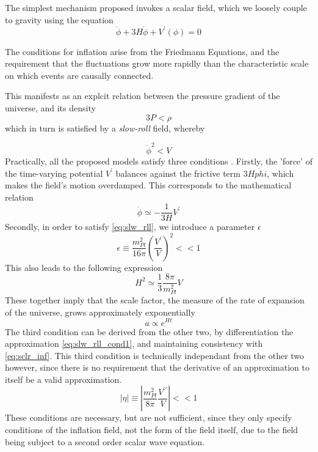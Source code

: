 The simplest mechanism proposed invokes a scalar field, which we loosely couple to gravity using the equation 
\begin{equation}\label{eq:sclr_inf}
\ddot{\phi} + 3 H \dot{\phi} + V^\prime(\phi) = 0
\end{equation}

The conditions for inflation arise from the Friedmann Equations, and the requirement that the fluctuations grow more rapidly than the characteristic scale on which events are causally connected. 

This manifests as an explcit relation between the pressure gradient of the universe, and its density
\begin{equation}\label{eq:inf_cndtn}
3 P < \rho
\end{equation}
which in turn is satisfied by a \emph{slow-roll} field, whereby 

\begin{equation}\label{eq:slw_rll}
\dot{\phi}^2 < V
\end{equation}
Practically, all the proposed models satisfy three conditions \cite{LiddleLyth:00}. Firstly, the 'force' of the time-varying potential $V^\prime$ balances against the frictive term $3 H \dot{phi}$, which makes the field's motion overdamped. This corresponds to the mathematical relation
\begin{equation}\label{eq:slw_rll_cond1}
\dot{\phi} \simeq - \frac{1}{3 H} V^\prime
\end{equation} 
Secondly, in order to satisfy \ref{eq:slw_rll}, we introduce a parameter $\epsilon$ 
\begin{equation}\label{eq:slw_rll_cond2}
\epsilon \equiv \frac{m_{Pl}^2}{16 \pi} \left(\frac{V^\prime}{V}\right)^2 << 1
\end{equation}
This also leads to the following expression
$$ H^2 \simeq \frac{1}{3} \frac{8 \pi}{m_{Pl}^2} V $$
These together imply that the scale factor, the measure of the rate of expansion of the universe, grows approximately exponentially
$$a \propto e^{Ht} $$
The third condition can be derived from the other two, by differentiation the approximation \ref{eq:slw_rll_cond1}, and maintaining consistency with \ref{eq:sclr_inf}. This third condition is technically independant from the other two however, since there is no requirement that the derivative of an approximation to itself be a valid approximation. 
\begin{equation}\label{eq:slw_rll_cond3}
|\eta| \equiv \left| \frac{m_{Pl}^2}{8 \pi} \frac{V^{\prime \prime}}{V} \right| << 1 
\end{equation}
These conditions are necessary, but are not sufficient, since they only specify conditions of the inflation field, not the form of the field itself, due to the field being subject to a second order scalar wave equation. 

